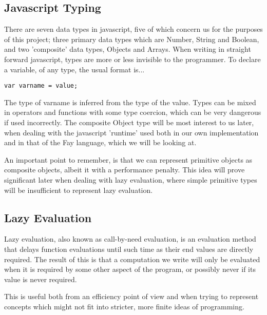 \documentclass[11pt]{article}
\begin{document}
\subsection{Javascript Typing}
There are seven data types in javascript, five of which concern us for the purposes
of this project; three primary data types which are Number, String and Boolean, 
and two 'composite' data types, Objects and Arrays. When writing in straight
forward javascript, types are more or less invisible to the programmer. To declare
a variable, of any type, the usual format is...
\begin{verbatim}
var varname = value;
\end{verbatim}
The type of varname is inferred from the type of the value. Types can be mixed
in operators and functions with some type coercion, which can be very dangerous
if used incorrectly. The composite Object type will be most interest to us later,
when dealing with the javascript 'runtime' used both in our own implementation
and in that of the Fay language, which we will be looking at.

An important point to remember, is that we can represent primitive objects as
composite objects, albeit it with a performance penalty. This idea will prove
significant later when dealing with lazy evaluation, where simple primitive
types will be insufficient to represent lazy evaluation.

\subsection{Lazy Evaluation}
Lazy evaluation, also known as call-by-need evaluation, is an evaluation method
that delays function evaluations until such time as their end values are directly
required. The result of this is that a computation we write will only be 
evaluated when it is required by some other aspect of the program, or possibly never
if its value is never required. 

This is useful both from an efficiency point of view and when trying to 
represent concepts which might not fit into stricter, more finite ideas of
programming. 
\end{document}
